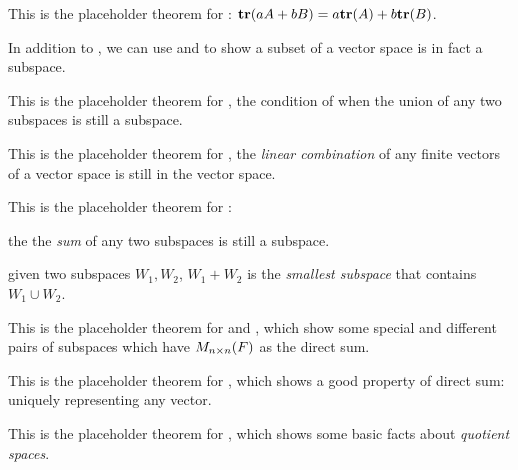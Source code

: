 \begin{additional theorem} \label{athm 1.3}
This is the placeholder theorem for : \(\textbf{tr}(aA + bB) = a \textbf{tr}(A) + b \textbf{tr}(B)\).
\end{additional theorem}

\begin{additional theorem} \label{athm 1.4}
In addition to , we can use  and  to show a subset of a vector space is in fact a subspace.
\end{additional theorem}

\begin{additional theorem} \label{athm 1.5}
This is the placeholder theorem for , the condition of when the union of any two subspaces is still a subspace.
\end{additional theorem}

\begin{additional theorem} \label{athm 1.6}
This is the placeholder theorem for , the \emph{linear combination} of any finite vectors of a vector space is still in the vector space.
\end{additional theorem}

\begin{additional theorem} \label{athm 1.7}
This is the placeholder theorem for :

 the the \emph{sum} of any two subspaces is still a subspace.

 given two subspaces \(W_1, W_2\), \(W_1 + W_2\) is the \emph{smallest subspace} that contains \(W_1 \cup W_2\).
\end{additional theorem}

\begin{additional theorem} \label{athm 1.8}
This is the placeholder theorem for  and , which show some special and different pairs of subspaces which have \(M_{n \times n}(F)\) as the direct sum.
\end{additional theorem}

\begin{additional theorem} \label{athm 1.9}
This is the placeholder theorem for , which shows a good property of direct sum: uniquely representing any vector.
\end{additional theorem}

\begin{additional theorem} \label{athm 1.10}
This is the placeholder theorem for , which shows some basic facts about \emph{quotient spaces}.
\end{additional theorem}
